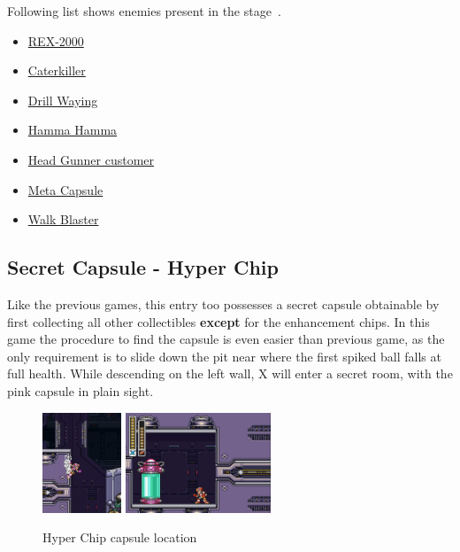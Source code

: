 Following list shows enemies present in the stage~\cite{wiki:Doppler_stage}.
\begin{itemize}
	\item \hyperlink{miniboss:REX}{REX-2000}
	\item \hyperlink{enem:Caterkiller}{Caterkiller}
	\item \hyperlink{enem:Drill_Waying}{Drill Waying}
	\item \hyperlink{enem:Hamma_Hamma}{Hamma Hamma}
	\item \hyperlink{enem:Head_Gunner_customer}{Head Gunner customer}
	\item \hyperlink{enem:Meta_Capsule}{Meta Capsule}
	\item \hyperlink{enem:Walk_Blaster}{Walk Blaster}
	
\end{itemize}

\subsection{Secret Capsule - Hyper Chip}
Like the previous games, this entry too possesses a secret capsule obtainable by first collecting all other collectibles \textbf{except} for the enhancement chips. In this game the procedure to find the capsule is even easier than previous game, as the only requirement is to slide down the pit near where the first spiked ball falls at full health. While descending on the left wall, X will enter a secret room, with the pink capsule in plain sight.

\begin{figure}[htp]
	\centering
	\includegraphics[height=3cm]{figures/X3/Doppler_stages/Hyper_chip_1.png}
	\includegraphics[height=3cm]{figures/X3/Doppler_stages/Hyper_chip.png}
	\caption{Hyper Chip capsule location}
\end{figure}

